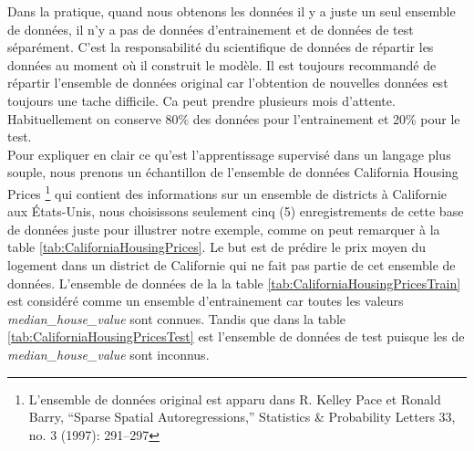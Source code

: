 \documentclass[12pt, french]{report}
\begin{document}
Dans la pratique, quand nous obtenons les données il y a juste un seul ensemble de données, il n'y a pas de données d'entrainement et de données de test séparément. C'est la responsabilité du scientifique de données de répartir les données  au moment où il construit le modèle. Il est toujours recommandé de  répartir l'ensemble de données original car l'obtention de nouvelles données est toujours une tache difficile. Ca peut prendre plusieurs mois d'attente. Habituellement on conserve 80\% des données pour l'entrainement et 20\% pour le test. \\

Pour expliquer en clair ce qu'est l'apprentissage supervisé dans un langage plus souple, nous prenons un échantillon de l'ensemble de données \guillemotleft California Housing Prices  \guillemotright\footnote{L'ensemble de données original est apparu dans R. Kelley Pace et Ronald Barry, “Sparse Spatial Autoregressions,” Statistics \& Probability Letters 33, no. 3 (1997): 291–297} qui contient des informations sur un ensemble de districts à Californie aux États-Unis, nous choisissons seulement cinq (5) enregistrements de cette base de données juste pour illustrer notre exemple, comme on peut remarquer à la table \ref{tab:CaliforniaHousingPrices}. Le but est de prédire le prix moyen du logement dans un district de Californie qui ne fait pas partie de cet ensemble de données. L'ensemble de données de la la table \ref{tab:CaliforniaHousingPricesTrain} est considéré comme un ensemble d'entrainement car toutes les valeurs \textit{median\_house\_value} sont connues. Tandis que dans la table \ref{tab:CaliforniaHousingPricesTest} est l'ensemble de données de test puisque les de  \textit{median\_house\_value} sont inconnus.



\end{document}
